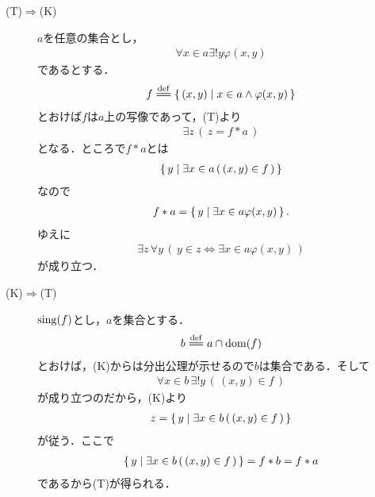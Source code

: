 	\begin{description}
		\item[(T)$\Longrightarrow$(K)]
			$a$を任意の集合とし，
			\begin{align}
				\forall x \in a \exists!y \varphi(x,y)
			\end{align}
			であるとする．
			\begin{align}
				f \defeq \Set{(x,y)}{x \in a \wedge \varphi(x,y)}
			\end{align}
			とおけば$f$は$a$上の写像であって，(T)より
			\begin{align}
				\exists z\, (\, z = f \ast a\, )
			\end{align}
			となる．ところで$f \ast a$とは
			\begin{align}
				\left\{\, y \mid \exists x \in a\, (\, (x,y) \in f\, )\, \right\}
			\end{align}
			なので
			\begin{align}
				f \ast a = \left\{\, y \mid \exists x \in a \varphi(x,y)\, \right\}.
			\end{align}
			ゆえに
			\begin{align}
				\exists z\, \forall y\, (\, y \in z \Longleftrightarrow
				\exists x \in a \varphi(x,y)\, )
			\end{align}
			が成り立つ．
			
		\item[(K)$\Longrightarrow$(T)]
			$\operatorname*{sing} (f)$とし，$a$を集合とする．
			\begin{align}
				b \defeq a \cap \dom{f}
			\end{align}
			とおけば，(K)からは分出公理が示せるので$b$は集合である．そして
			\begin{align}
				\forall x \in b\, \exists!y\, (\, (x,y) \in f\, )
			\end{align}
			が成り立つのだから，(K)より
			\begin{align}
				z = \left\{\, y \mid \exists x \in b\, (\, (x,y) \in f\, )\, \right\}
			\end{align}
			が従う．ここで
			\begin{align}
				\left\{\, y \mid \exists x \in b\, (\, (x,y) \in f\, )\, \right\}
				= f \ast b
				= f \ast a
			\end{align}
			であるから(T)が得られる．
			\QED
	\end{description}